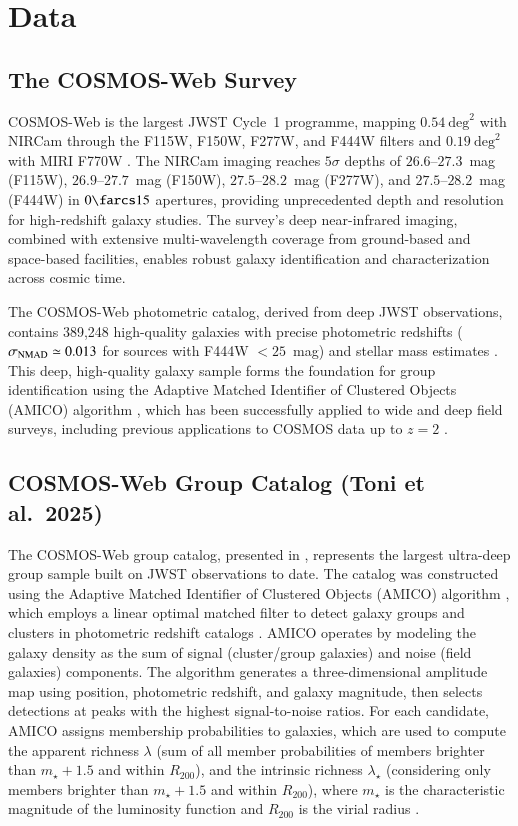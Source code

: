 \documentclass{aa}
\begin{document}
\section{Data}

\subsection{The COSMOS-Web Survey}

COSMOS-Web is the largest JWST Cycle~1 programme, mapping $0.54~\mathrm{deg}^2$ with NIRCam through the F115W, F150W, F277W, and F444W filters and $0.19~\mathrm{deg}^2$ with MIRI F770W \citep{Casey2023}. The NIRCam imaging reaches $5\sigma$ depths of $26.6$--$27.3$~mag (F115W), $26.9$--$27.7$~mag (F150W), $27.5$--$28.2$~mag (F277W), and $27.5$--$28.2$~mag (F444W) in $0\farcs15$ apertures, providing unprecedented depth and resolution for high-redshift galaxy studies. The survey's deep near-infrared imaging, combined with extensive multi-wavelength coverage from ground-based and space-based facilities, enables robust galaxy identification and characterization across cosmic time.

The COSMOS-Web photometric catalog, derived from deep JWST observations, contains 389,248 high-quality galaxies with precise photometric redshifts ($\sigma_{\rm NMAD} \simeq 0.013$ for sources with F444W $< 25$~mag) and stellar mass estimates \citep{Shuntov2025,Toni2025,Khostovan2025}. This deep, high-quality galaxy sample forms the foundation for group identification using the Adaptive Matched Identifier of Clustered Objects (AMICO) algorithm \citep{Bellagamba2018,Maturi2019}, which has been successfully applied to wide and deep field surveys, including previous applications to COSMOS data up to $z = 2$ \citep{Toni2024}.

\subsection{COSMOS-Web Group Catalog (Toni et al.\ 2025)}

The COSMOS-Web group catalog, presented in \citet{Toni2025}, represents the largest ultra-deep group sample built on JWST observations to date. The catalog was constructed using the Adaptive Matched Identifier of Clustered Objects (AMICO) algorithm \citep{Bellagamba2018,Maturi2019}, which employs a linear optimal matched filter to detect galaxy groups and clusters in photometric redshift catalogs \citep{Toni2025}. AMICO operates by modeling the galaxy density as the sum of signal (cluster/group galaxies) and noise (field galaxies) components. The algorithm generates a three-dimensional amplitude map using position, photometric redshift, and galaxy magnitude, then selects detections at peaks with the highest signal-to-noise ratios. For each candidate, AMICO assigns membership probabilities to galaxies, which are used to compute the apparent richness $\lambda$ (sum of all member probabilities of members brighter than $m_\star + 1.5$ and within $R_{200}$), and the intrinsic richness $\lambda_\star$ (considering only members brighter than $m_\star + 1.5$ and within $R_{200}$), where $m_\star$ is the characteristic magnitude of the luminosity function and $R_{200}$ is the virial radius \citep{Toni2025}.
\end{document}
